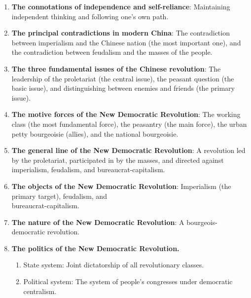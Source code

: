 \documentclass[11pt,a4paper]{ctexart}
\begin{document}
\begin{enumerate}[leftmargin=2em]
    \item \textbf{The connotations of independence and self-reliance}: Maintaining independent thinking and following one's own path.
    
    \item \textbf{The principal contradictions in modern China}: The contradiction between imperialism and the Chinese nation (the most important one), and the contradiction between feudalism and the masses of the people.
    
    \item \textbf{The three fundamental issues of the Chinese revolution}: The leadership of the proletariat (the central issue), the peasant question (the basic issue), and distinguishing between enemies and friends (the primary issue).
    
    \item \textbf{The motive forces of the New Democratic Revolution}: The working class (the most fundamental force), the peasantry (the main force), the urban petty bourgeoisie (allies), and the national bourgeoisie.
    
    \item \textbf{The general line of the New Democratic Revolution}: A revolution led by the proletariat, participated in by the masses, and directed against imperialism, feudalism, and bureaucrat-capitalism.
    
    \item \textbf{The objects of the New Democratic Revolution}: Imperialism (the primary target), feudalism, and \\ bureaucrat-capitalism.
    
    \item \textbf{The nature of the New Democratic Revolution}: A bourgeois-democratic revolution.
    
    \item \textbf{The politics of the New Democratic Revolution.}
    \begin{enumerate}[label=(\arabic*),leftmargin=2em]
        \item State system: Joint dictatorship of all revolutionary classes.
        \item Political system: The system of people's congresses under democratic centralism.
    \end{enumerate}
    

\end{enumerate}
\end{document}
